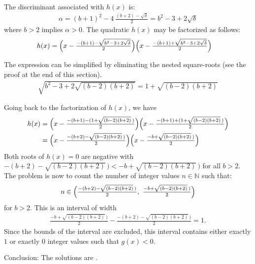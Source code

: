 The discriminant associated with $h(x)$ is: 
\begin{align*}
\alpha 
  = (b+1)^{2} -4 \ \tfrac{(b+2) - \sqrt{\delta}}{2}
  = b^{2}-3+2\sqrt{\delta}
\end{align*}
where $b>2$ implies $\alpha>0$. The quadratic $h(x)$ may be factorized as follows:
\begin{align*}
h(x) 
& = \Bigl(x-\tfrac{-(b+1)-\sqrt{b^{2}-3+2\sqrt{\delta}}}{2}\Bigr)
    \Bigl(x-\tfrac{-(b+1)+\sqrt{b^{2}-3+2\sqrt{\delta}}}{2}\Bigr)
\end{align*}

The expression can be simplified by eliminating the nested square-roots (see the proof at the end of this section).
\begin{align*}
\sqrt{b^{2}-3+2\sqrt{(b-2)(b+2)}}
= 1 + \sqrt{(b-2)(b+2)}
\end{align*}

Going back to the factorization of $h(x)$, we have
\begin{align*}
h(x) 
& = \Bigl(x-\tfrac{-(b+1)-(1+\sqrt{(b-2)(b+2)}\,)}{2}\Bigr)
    \Bigl(x-\tfrac{-(b+1)+(1+\sqrt{(b-2)(b+2)}\,)}{2}\Bigr)
\\
& = \Bigl(x-\tfrac{-(b+2)-\sqrt{(b-2)(b+2)}\,)}{2}\Bigr)
    \Bigl(x-\tfrac{-b+\sqrt{(b-2)(b+2)}\,)}{2}\Bigr)
\end{align*}
Both roots of $h(x)=0$ are negative with $-(b+2)-\sqrt{(b-2)(b+2)}\,)<-b+\sqrt{(b-2)(b+2)}\,)$ for all $b>2$.
The problem is now to count the number of integer values $n\in\mathbb{N}$ such that:
\begin{align*}
n \in \Bigl(\tfrac{-(b+2)-\sqrt{(b-2)(b+2)}\,)}{2},\
            \tfrac{-b+\sqrt{(b-2)(b+2)}\,)}{2}
      \Bigr)
\end{align*}
for $b>2$. This is an interval of width
\begin{align*}
\tfrac{-b+\sqrt{(b-2)(b+2)}\,)}{2}-\tfrac{-(b+2)-\sqrt{(b-2)(b+2)}\,)}{2}=1.
\end{align*}
Since the bounds of the interval are excluded, this interval contains either exactly $1$ or exactly $0$ integer values such that $g(x)<0$. 

Conclusion: The solutions are .


